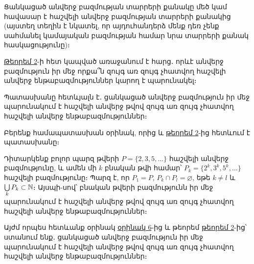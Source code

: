 \documentclass[./main.tex]{subfiles}
\begin{document}
\begin{hetevanq}\label{ch3cor1}
Ցանկացած անվերջ բազմության տարրերի քանակը մեծ կամ հավա\-սար է հաշվելի անվերջ բազմության տարրերի քանակից (այստեղ տեղին է նկատել, որ այդուհանդերձ մենք դեռ չենք սահմանել կամայական բազմության համար նրա տարրերի քանակ հասկացությունը)։
\end{hetevanq}

\par \hyperref[ch3thm2]{Թեորեմ 2}-ի հետ կապված առաջանում է հարց․ որևէ անվերջ բազմություն իր մեջ որքա՞ն զույգ առ զույգ չհատվող հաշվելի անվերջ ենթաբազմություններ կարող է պարունակել։
\par Պատասխանը հետևյալն է․ ցանկացած անվերջ բազմություն իր մեջ պարու\-նա\-կում է հաշվելի անվերջ թվով զույգ առ զույգ չհատվող հաշվելի անվերջ ենթա\-բազ\-մու\-թյուններ։
\par Բերենք համապատասխան օրինակ, որից և \hyperref[ch3thm2]{թեորեմ 2}-ից հետևում է պատաս\-խա\-նը։

\begin{example}\label{ch3ex6}
Դիտարկենք բոլոր պարզ թվերի $P=\{2,3,5,\dots\}$ հաշվելի անվերջ բազմությունը, և ամեն մի $k$ բնական թվի համար՝ $P_k=\{2^k,3^k,5^k,\dots\}$ հաշվելի բազմությունը։ Պարզ է, որ ${P_1=P}$, ${P_k\cap P_l=\varnothing}$, եթե $k\neq l$ և $\bigcup\limits_k P_k \subset \mathbb{N}$։ Այսպի-\linebreak սով՝ բնական թվերի բազմությունն իր մեջ պարունակում է հաշվելի անվերջ թվով զույգ առ զույգ չհատվող հաշվելի անվերջ ենթաբազմութ\-յուն\-ներ։
\end{example}

\par Այժմ որպես հետևանք օրինակ \hyperref[ch3ex6]{օրինակ 6}-ից և թեորեմ \hyperref[ch3thm2]{թեորեմ 2}-ից՝ ստանում ենք․ ցանկացած անվերջ բազմու\-թյուն իր մեջ պարունակում է հաշվելի անվերջ թվով զույգ առ զույգ չհատվող հաշվելի անվերջ ենթաբազմություններ։
\end{document}
